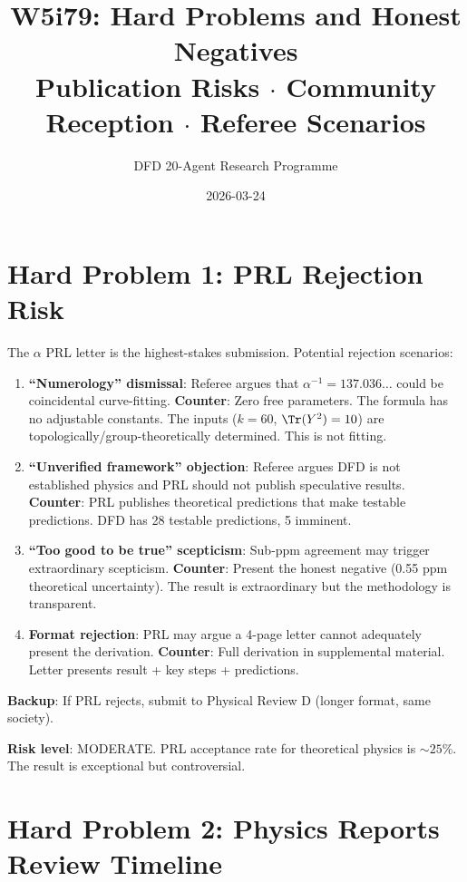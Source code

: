 \documentclass[11pt,a4paper]{article}
\title{W5i79: Hard Problems and Honest Negatives\\[6pt]
\large Publication Risks $\cdot$ Community Reception $\cdot$ Referee Scenarios}
\author{DFD 20-Agent Research Programme}
\date{2026-03-24}
\begin{document}
\maketitle

\section{Hard Problem 1: PRL Rejection Risk}

The $\alpha$ PRL letter is the highest-stakes submission. Potential rejection scenarios:
\begin{enumerate}[nosep]
\item \textbf{``Numerology'' dismissal}: Referee argues that $\alpha^{-1} = 137.036\ldots$ could be coincidental curve-fitting. \textbf{Counter}: Zero free parameters. The formula has no adjustable constants. The inputs ($k=60$, $\Tr(Y^2)=10$) are topologically/group-theoretically determined. This is not fitting.

\item \textbf{``Unverified framework'' objection}: Referee argues DFD is not established physics and PRL should not publish speculative results. \textbf{Counter}: PRL publishes theoretical predictions that make testable predictions. DFD has 28 testable predictions, 5 imminent.

\item \textbf{``Too good to be true'' scepticism}: Sub-ppm agreement may trigger extraordinary scepticism. \textbf{Counter}: Present the honest negative (0.55 ppm theoretical uncertainty). The result is extraordinary but the methodology is transparent.

\item \textbf{Format rejection}: PRL may argue a 4-page letter cannot adequately present the derivation. \textbf{Counter}: Full derivation in supplemental material. Letter presents result + key steps + predictions.
\end{enumerate}

\textbf{Backup}: If PRL rejects, submit to Physical Review D (longer format, same society).

\textbf{Risk level}: MODERATE. PRL acceptance rate for theoretical physics is $\sim 25\%$. The result is exceptional but controversial.

\section{Hard Problem 2: Physics Reports Review Timeline}
\end{document}
